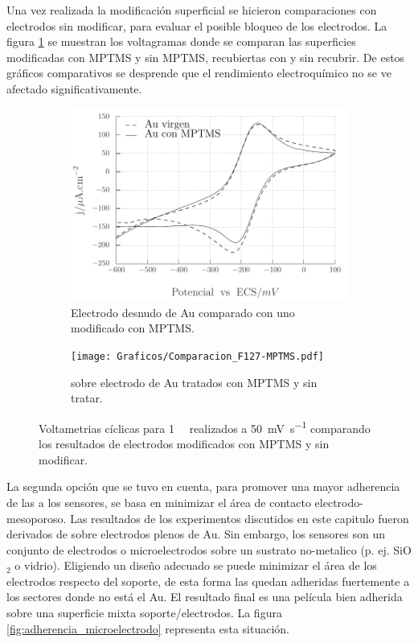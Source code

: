 			Una vez realizada la modificación superficial se hicieron comparaciones con electrodos sin modificar, para evaluar el posible bloqueo de los electrodos. La figura \ref{fig:comparaciones_MPTMS} se muestran los voltagramas donde se comparan las superficies modificadas con MPTMS y sin MPTMS, recubiertas con \pdm\space y sin recubrir. De estos gráficos comparativos se desprende que el rendimiento electroquímico no se ve afectado significativamente.
	 			\begin{figure}[th]
		 	   	    \begin{subfigure}[t]{0.49\textwidth}
			        	\includegraphics[width=\textwidth]{Graficos/Comparacion_Au-MPTMS.pdf}
			       		\caption{Electrodo desnudo de Au comparado con uno modificado con MPTMS.}		 
			       		\end{subfigure}
					\begin{subfigure}[t]{0.49\textwidth}
			 	   	    \texttt{[image: Graficos/Comparacion\_F127-MPTMS.pdf]}
			       		\caption{\pdmF\space sobre electrodo de Au tratados con MPTMS y sin tratar.}
			       		\end{subfigure}
					 	\caption[Comparacion de superficies con y sin MPTMS.]{Voltametrias cíclicas para \aminorutenio\space \SI{1}{\milli\Molar} realizados a \SI{50}{\milli\volt.\second^{-1}} comparando los resultados de electrodos modificados con MPTMS y sin modificar.}
					 \label{fig:comparaciones_MPTMS}	
				     \end{figure}
			La segunda opción que se tuvo en cuenta, para promover una mayor adherencia de las \pdm\space a los sensores, se basa en minimizar el área de contacto electrodo-mesoporoso. Las resultados de los experimentos discutidos en este capitulo fueron derivados de \pdm\space sobre electrodos plenos de Au. Sin embargo, los sensores son un conjunto de electrodos o microelectrodos sobre un sustrato no-metalico (p. ej. SiO$_2$ o vidrio). Eligiendo un diseño adecuado se puede minimizar el área de los electrodos respecto del soporte, de esta forma las \pdm\space quedan adheridas fuertemente a los sectores donde no está el Au. El resultado final es una película bien adherida sobre una superficie mixta soporte/electrodos.  La figura \ref{fig:adherencia_microelectrodo} representa esta situación.
